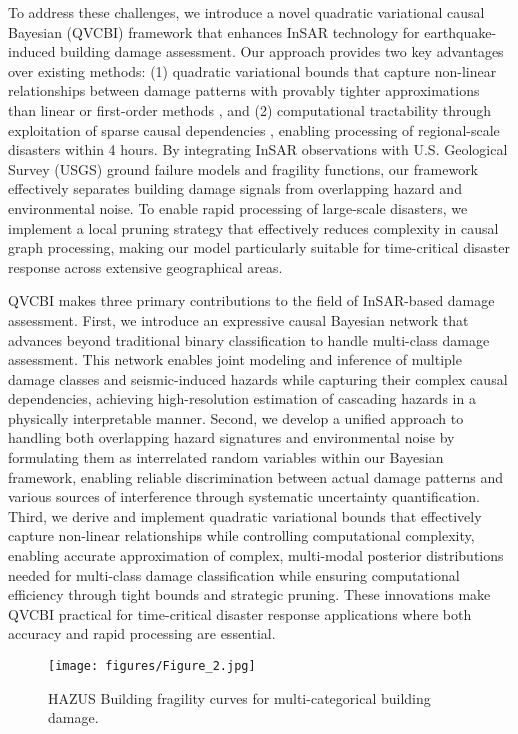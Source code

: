 \documentclass[review]{elsarticle}
\begin{document}
To address these challenges, we introduce a novel quadratic variational causal Bayesian (QVCBI) framework that enhances InSAR technology for earthquake-induced building damage assessment. Our approach provides two key advantages over existing methods: (1) quadratic variational bounds that capture non-linear relationships between damage patterns with provably tighter approximations than linear or first-order methods \cite{hoffman2013stochastic}, and (2) computational tractability through exploitation of sparse causal dependencies \cite{spiegelhalter1998bayesian}, enabling processing of regional-scale disasters within 4 hours. By integrating InSAR observations with U.S. Geological Survey (USGS) ground failure models and fragility functions, our framework effectively separates building damage signals from overlapping hazard and environmental noise. To enable rapid processing of large-scale disasters, we implement a local pruning strategy that effectively reduces complexity in causal graph processing, making our model particularly suitable for time-critical disaster response across extensive geographical areas.

QVCBI makes three primary contributions to the field of InSAR-based damage assessment. First, we introduce an expressive causal Bayesian network that advances beyond traditional binary classification to handle multi-class damage assessment. This network enables joint modeling and inference of multiple damage classes and seismic-induced hazards while capturing their complex causal dependencies, achieving high-resolution estimation of cascading hazards in a physically interpretable manner. Second, we develop a unified approach to handling both overlapping hazard signatures and environmental noise by formulating them as interrelated random variables within our Bayesian framework, enabling reliable discrimination between actual damage patterns and various sources of interference through systematic uncertainty quantification. Third, we derive and implement quadratic variational bounds that effectively capture non-linear relationships while controlling computational complexity, enabling accurate approximation of complex, multi-modal posterior distributions needed for multi-class damage classification while ensuring computational efficiency through tight bounds and strategic pruning. These innovations make QVCBI practical for time-critical disaster response applications where both accuracy and rapid processing are essential.

\begin{figure}[t]
    \centering
\texttt{[image: figures/Figure\_2.jpg]}
    \caption{HAZUS Building fragility curves for multi-categorical building damage.}
    \label{Fragility}
\end{figure}
\end{document}
